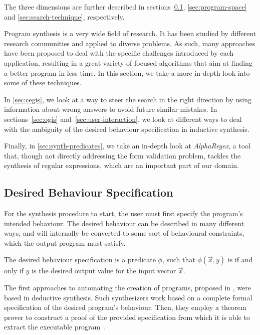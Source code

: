 \medskip

The three dimensions are further described in sections~\ref{sec:desired-behaviour-spec}, \ref{sec:program-space} and \ref{sec:search-technique}, respectively.

Program synthesis is a very wide field of research. It has been studied by different research communities and applied to diverse problems. As such, many approaches have been proposed to deal with the specific challenges introduced by each application, resulting in a great variety of focused algorithms that aim at finding a better program in less time. In this section, we take a more in-depth look into some of these techniques.

In \autoref{sec:cegis}, we look at a way to steer the search in the right direction by using information about wrong answers to avoid future similar mistakes. In sections~\ref{sec:ogis} and~\ref{sec:user-interaction}, we look at different ways to deal with the ambiguity of the desired behaviour specification in inductive synthesis.

Finally, in \autoref{sec:synth-predicates}, we take an in-depth look at \textit{AlphaRegex}, a tool that, though not directly addressing the form validation problem, tackles the synthesis of regular expressions, which are an important part of our domain.

\subsection{Desired Behaviour Specification} \label{sec:desired-behaviour-spec}
For the synthesis procedure to start, the user must first specify the program's intended behaviour. The desired behaviour can be described in many different ways, and will internally be converted to some sort of behavioural constraints, which the output program must satisfy.

\begin{definition}
The desired behaviour specification is a predicate \(\phi\), such that \(\phi(\vec{x}, y)\) is \true{} if and only if \(y\) is the desired output value for the input vector \(\vec{x}\).
\end{definition}


The first approaches to automating the creation of programs, proposed in \citeyear{DBLP:conf/ijcai/Green69} \cite{DBLP:conf/ijcai/Green69,DBLP:conf/ijcai/WaldingerL69}, were based in deductive synthesis.
Such synthesizers work based on a complete formal specification of the desired program's behaviour.
Then, they employ a theorem prover to construct a proof of the provided specification from which it is able to extract the executable program~\cite{DBLP:conf/ijcai/Green69,DBLP:journals/cacm/MannaW71,DBLP:journals/toplas/MannaW80,DBLP:conf/ijcai/WaldingerL69}.

